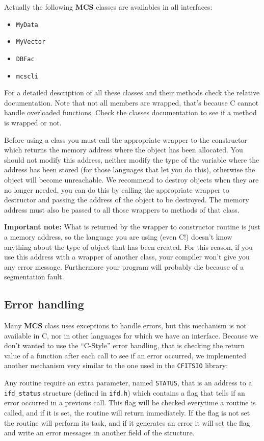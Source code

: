 \documentclass[12pt,titlepage]{book}
\newcommand{\mcs}{\textbf{MCS} }
\begin{document}
\noindent Actually the following \mcs classes are availables in all
interfaces:
\begin{itemize}
\item \verb|MyData|
\item \verb|MyVector|
\item \verb|DBFac|
\item \verb|mcscli|
\end{itemize}
For a detailed description of all these classes and their methods check the
relative documentation. Note that not all members are wrapped, that's because
C cannot handle overloaded functions. Check the classes documentation to see
if a method is wrapped or not.

\noindent Before using a class you must call the appropriate wrapper to the
constructor which returns the memory address where the object has been
allocated. You should not modify this address, neither modify the type of the
variable where the address has been stored (for those languages that let you
do this), otherwise the object will become unreachable. We recommend to
destroy objects when they are no longer needed, you can do this by calling the
appropriate wrapper to destructor and passing the address of the object to be
destroyed. The memory address must also be passed to all those wrappers to
methods of that class.

\noindent \textbf{Important note:} What is returned by the wrapper to
constructor routine is just a memory address, so the language you are using
(even C!)  doesn't know anything about the type of object that has been
created. For this reason, if you use this address with a wrapper of another
class, your compiler won't give you any error message. Furthermore your
program will probably die because of a segmentation fault.


\subsection{Error handling}
\label{ssec-Error handling}
Many \mcs class uses exceptions to handle errors, but this mechanism is not
available in C, nor in other languages for which we have an interface. Because
we don't wanted to use the ``C-Style'' error handling, that is checking the
return value of a function after each call to see if an error occurred, we
implemented another mechanism very similar to the one used in the
\verb|CFITSIO| library:

\noindent Any routine require an extra parameter, named \verb|STATUS|, that is
an address to a \verb|ifd_status| structure (defined in \verb|ifd.h|) which
contains a flag that tells if an error occurred in a previous call. This flag
will be checked everytime a routine is called, and if it is set, the routine
will return immediately. If the flag is not set the routine will perform its
task, and if it generates an error it will set the flag and write an error
messages in another field of the structure.
\end{document}
